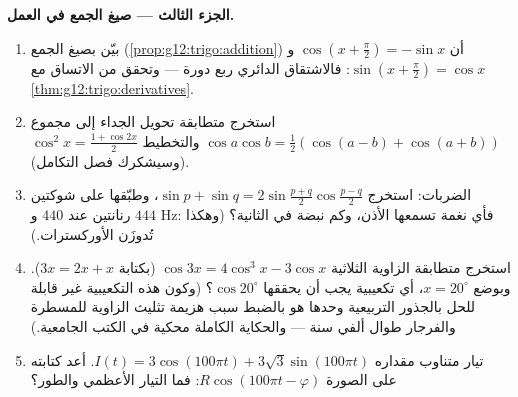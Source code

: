 \begin{problem}
\medskip
\noindent\textbf{الجزء الثالث --- صيغ الجمع في العمل.}
\begin{enumerate}[resume]
  \item بيّن بصيغ الجمع
        (\cref{prop:g12:trigo:addition}) أن
        $\cos\left(x + \frac\pi2\right) = -\sin x$ و
        $\sin\left(x + \frac\pi2\right) = \cos x$: فالاشتقاق
        الدائري ربع دورة --- وتحقق من الاتساق
        مع \cref{thm:g12:trigo:derivatives}.
  \item استخرج متطابقة تحويل الجداء إلى مجموع
        $\cos a \cos b = \frac12\left(\cos(a - b) +
        \cos(a + b)\right)$ والتخطيط
        $\cos^2 x = \frac{1 + \cos 2x}{2}$ (وسيشكرك فصل
        التكامل).
  \item الضربات: استخرج
        $\sin p + \sin q = 2 \sin\frac{p + q}{2}
        \cos\frac{p - q}{2}$، وطبّقها على شوكتين رنانتين
        عند $440$ و $444$ Hz: فأي نغمة تسمعها الأذن، وكم
        نبضة في الثانية؟ (وهكذا تُدوزَن الأوركسترات.)
  \item استخرج متطابقة الزاوية الثلاثية
        $\cos 3x = 4\cos^3 x - 3\cos x$
        (بكتابة $3x = 2x + x$). وبوضع $x = 20^\circ$، أي
         تكعيبية يجب أن يحققها $\cos 20^\circ$؟ (وكون هذه
        التكعيبية غير قابلة للحل بالجذور التربيعية وحدها هو
        بالضبط سبب هزيمة تثليث الزاوية للمسطرة
        والفرجار طوال ألفي سنة --- والحكاية الكاملة
        محكية في الكتب الجامعية.)
  \item تيار متناوب مقداره
        $I(t) = 3\cos(100\pi t) + 3\sqrt3 \sin(100\pi t)$.
        أعد كتابته على الصورة $R\cos(100\pi t - \varphi)$: فما
        التيار الأعظمي والطور؟
\end{enumerate}


\end{problem}
